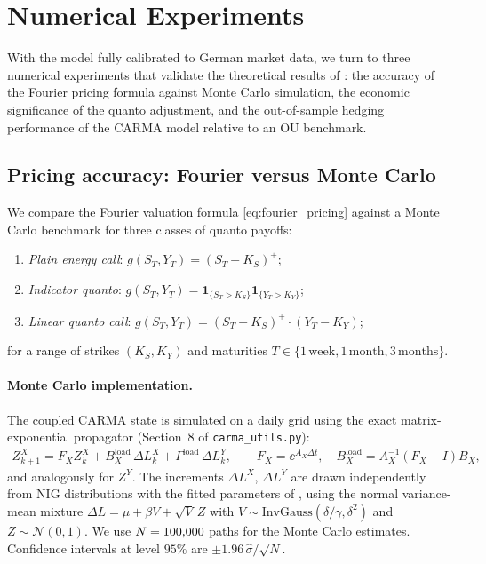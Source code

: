 \section{Numerical Experiments}\label{sec:numerical}

With the model fully calibrated to German market data, we turn to three
numerical experiments that validate the theoretical results of
: the accuracy of
the Fourier pricing formula against Monte Carlo simulation, the economic
significance of the quanto adjustment, and the out-of-sample hedging
performance of the CARMA model relative to an OU benchmark.

\subsection{Pricing accuracy: Fourier versus Monte Carlo}\label{ssec:pricing_mc}

We compare the Fourier valuation formula \eqref{eq:fourier_pricing} against a
Monte Carlo benchmark for three classes of quanto payoffs:
\begin{enumerate}[label=(\roman*)]
  \item \emph{Plain energy call}: $g(S_T,Y_T) = (S_T-K_S)^+$;
  \item \emph{Indicator quanto}:
    $g(S_T,Y_T) = \mathbf{1}_{\{S_T>K_S\}}\mathbf{1}_{\{Y_T>K_Y\}}$;
  \item \emph{Linear quanto call}:
    $g(S_T,Y_T) = (S_T-K_S)^+\cdot (Y_T - K_Y)$;
\end{enumerate}
for a range of strikes $(K_S, K_Y)$ and maturities $T\in\{1\,\mathrm{week},
1\,\mathrm{month}, 3\,\mathrm{months}\}$.

\paragraph{Monte Carlo implementation.}
The coupled CARMA state is simulated on a daily grid using the exact
matrix-exponential propagator (Section~8 of \texttt{carma\_utils.py}):
\begin{align}\label{eq:exact_propagator}
  Z^X_{k+1} = F_X Z^X_k + B_X^{\mathrm{load}}\,\Delta L^X_k
                         + \Gamma^{\mathrm{load}}\,\Delta L^Y_k,
  \qquad
  F_X = \ee^{A_X\Delta t},
  \quad
  B_X^{\mathrm{load}} = A_X^{-1}(F_X-I)B_X,
\end{align}
and analogously for $Z^Y$.
The increments $\Delta L^X$, $\Delta L^Y$ are drawn independently from
NIG distributions with the fitted parameters of ,
using the normal variance-mean mixture
$\Delta L = \mu + \beta V + \sqrt{V}\,Z$ with
$V\sim\mathrm{InvGauss}(\delta/\gamma,\delta^2)$ and $Z\sim\mathcal{N}(0,1)$.
We use $N=\textup{100{,}000}$ paths for the Monte Carlo estimates.
Confidence intervals at level $95\%$ are $\pm 1.96\,\hat\sigma/\sqrt{N}$.

